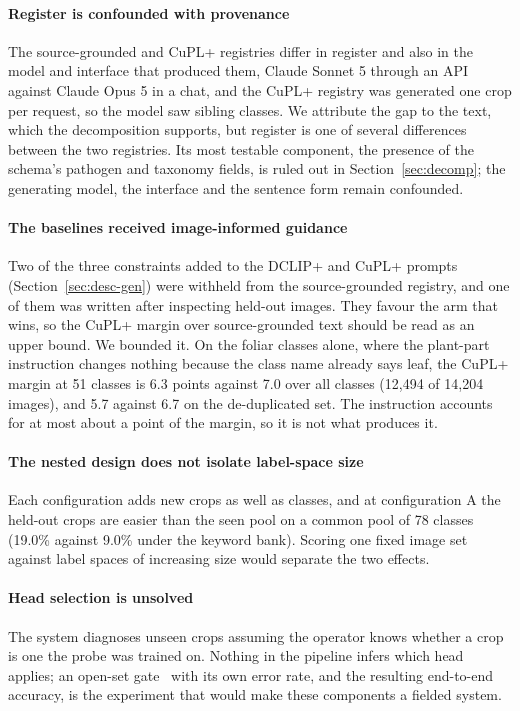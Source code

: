 \documentclass[a4paper,fleqn]{cas-dc}
\begin{document}
\paragraph{Register is confounded with provenance} The source-grounded and CuPL+ registries differ in
register and also in the model and interface that produced them, Claude Sonnet 5 through an API
against Claude Opus 5 in a chat, and the CuPL+ registry was generated one crop per request, so the
model saw sibling classes. We attribute the gap to the text, which the decomposition supports, but register is one of several
differences between the two registries. Its most testable component, the presence of the schema's
pathogen and taxonomy fields, is ruled out in Section~\ref{sec:decomp}; the generating model, the
interface and the sentence form remain confounded.

\paragraph{The baselines received image-informed guidance} Two of the three constraints added to the
DCLIP+ and CuPL+ prompts (Section~\ref{sec:desc-gen}) were withheld from the source-grounded
registry, and one of them was written after inspecting held-out images. They favour the arm that wins, so the CuPL+ margin over source-grounded text should be read as an
upper bound. We bounded it. On the foliar classes alone, where the plant-part instruction changes
nothing because the class name already says leaf, the CuPL+ margin at 51 classes is 6.3 points
against 7.0 over all classes (12,494 of 14,204 images), and 5.7 against 6.7 on the de-duplicated
set. The instruction accounts for at most about a point of the margin, so it is not what produces
it.

\paragraph{The nested design does not isolate label-space size} Each configuration adds new crops as
well as classes, and at configuration A the held-out crops are easier than the seen pool on a common
pool of 78 classes (19.0\% against 9.0\% under the keyword bank). Scoring one fixed image set against
label spaces of increasing size would separate the two effects.

\paragraph{Head selection is unsolved} The system diagnoses unseen crops assuming the operator knows
whether a crop is one the probe was trained on. Nothing in the pipeline infers which head applies; an
open-set gate~\citep{scheirer2013openset} with its own error rate, and the resulting end-to-end
accuracy, is the experiment that would make these components a fielded system.
\end{document}
